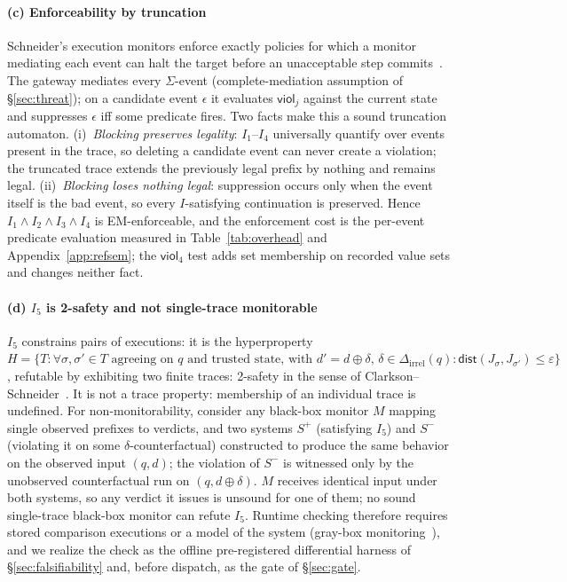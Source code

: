 \documentclass[conference,compsoc]{IEEEtran}
\theoremstyle{definition}
\theoremstyle{plain}
\newcommand{\Ione}{\ensuremath{I_1}}
\newcommand{\Itwo}{\ensuremath{I_2}}
\newcommand{\Ithree}{\ensuremath{I_3}}
\newcommand{\Ifour}{\ensuremath{I_4}}
\newcommand{\Ifive}{\ensuremath{I_5}}
\newcommand{\Dirrel}{\ensuremath{\Delta_{\mathrm{irrel}}}}
\newcommand{\dist}{\ensuremath{\mathsf{dist}}}
\begin{document}
\paragraph{(c) Enforceability by truncation}
Schneider's execution monitors enforce exactly policies for which
a monitor mediating each event can halt the target before an
unacceptable step commits~\cite{schneider}. The gateway mediates
every $\Sigma$-event (complete-mediation assumption of
\S\ref{sec:threat}); on a candidate event $\epsilon$ it evaluates
$\mathsf{viol}_j$ against the current state and suppresses
$\epsilon$ iff some predicate fires. Two facts make this a sound
truncation automaton. (i)~\emph{Blocking preserves legality}:
\Ione--\Ifour{} universally quantify over events present in the
trace, so deleting a candidate event can never create a violation;
the truncated trace extends the previously legal prefix by nothing
and remains legal. (ii)~\emph{Blocking loses nothing legal}:
suppression occurs only when the event itself is the bad event, so
every $I$-satisfying continuation is preserved. Hence
$\Ione \wedge \Itwo \wedge \Ithree \wedge \Ifour$ is EM-enforceable, and the
enforcement cost is the per-event predicate evaluation measured in
Table~\ref{tab:overhead} and Appendix~\ref{app:refsem}; the
$\mathsf{viol}_4$ test adds set membership on recorded value sets and
changes neither fact.

\paragraph{(d) \Ifive{} is 2-safety and not single-trace monitorable}
\Ifive{} constrains pairs of executions: it is the hyperproperty
$H = \{T : \forall \sigma, \sigma' \in T \text{ agreeing on } q
\text{ and trusted state, with } d' = d \oplus \delta,\,
\delta \in \Dirrel(q) : \dist(J_\sigma, J_{\sigma'}) \leq \varepsilon\}$,
refutable by exhibiting two finite traces: 2-safety in the sense
of Clarkson--Schneider~\cite{hyperprops}. It is not a trace
property: membership of an individual trace is undefined. For
non-monitorability, consider any black-box monitor $M$ mapping
single observed prefixes to verdicts, and two systems $S^{+}$
(satisfying \Ifive) and $S^{-}$ (violating it on some
$\delta$-counterfactual) constructed to produce the same behavior
on the observed input $(q, d)$; the violation of $S^{-}$ is
witnessed only by the unobserved counterfactual run on
$(q, d \oplus \delta)$. $M$ receives identical input under both
systems, so any verdict it issues is unsound for one of them; no
sound single-trace black-box monitor can refute \Ifive. Runtime
checking therefore requires stored comparison executions or a
model of the system (gray-box monitoring~\cite{finkbeiner,stucki}), and we realize the check as the offline pre-registered
differential harness of \S\ref{sec:falsifiability} and, before dispatch, as the gate of \S\ref{sec:gate}.
\end{document}
